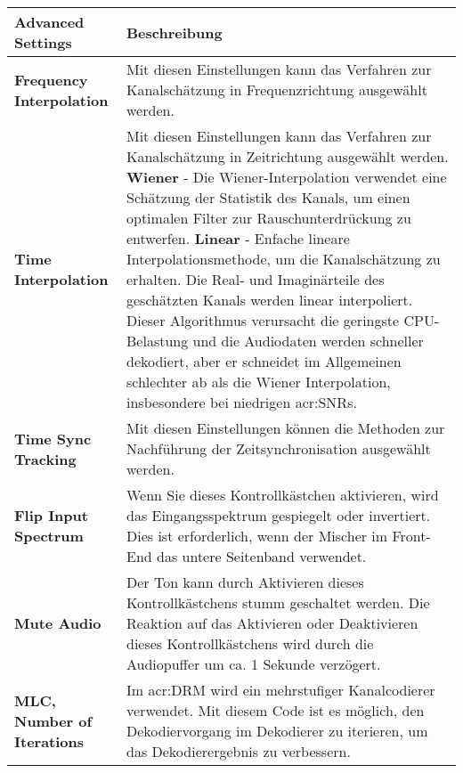 \begin{table}[htb]
	\begin{center}
		\begin{tabular}{p{0.25\linewidth} p{0.75\linewidth}}	
			\toprule
			\textbf{Advanced Settings} & \textbf{Beschreibung}\\
			\midrule
			\textbf{Frequency Interpolation} & Mit diesen Einstellungen kann das Verfahren zur Kanalschätzung in Frequenzrichtung ausgewählt werden.\\
			
			\textbf{Time Interpolation} & Mit diesen Einstellungen kann das Verfahren zur Kanalschätzung in Zeitrichtung ausgewählt werden.\newline
			\textbf{Wiener} - Die Wiener-Interpolation verwendet eine Schätzung der Statistik des Kanals, um einen optimalen Filter zur Rauschunterdrückung zu entwerfen.\newline
			\textbf{Linear} - Enfache lineare Interpolationsmethode, um die Kanalschätzung zu erhalten. Die Real- und Imaginärteile des geschätzten Kanals werden linear interpoliert. Dieser Algorithmus verursacht die geringste CPU-Belastung und die Audiodaten werden schneller dekodiert, aber er schneidet im Allgemeinen schlechter ab als die Wiener Interpolation, insbesondere bei niedrigen \gls{acr:SNR}s.\\
			
			\textbf{Time Sync Tracking} & 	Mit diesen Einstellungen können die Methoden zur Nachführung der Zeitsynchronisation ausgewählt werden. \\
			
			\textbf{Flip Input Spectrum} & Wenn Sie dieses Kontrollkästchen aktivieren, wird das Eingangsspektrum gespiegelt oder invertiert. Dies ist erforderlich, wenn der Mischer im Front-End das untere Seitenband verwendet.
			\\
			
			\textbf{Mute Audio} & Der Ton kann durch Aktivieren dieses Kontrollkästchens stumm geschaltet werden. Die Reaktion auf das Aktivieren oder Deaktivieren dieses Kontrollkästchens wird durch die Audiopuffer um ca. 1 Sekunde verzögert.
			\\
			
			\textbf{MLC, Number of Iterations} & Im \gls{acr:DRM} wird ein  mehrstufiger Kanalcodierer verwendet. Mit diesem Code ist es möglich, den Dekodiervorgang im Dekodierer zu iterieren, um das Dekodierergebnis zu verbessern. \\
			

\end{tabular}
\end{center}
\end{table}
